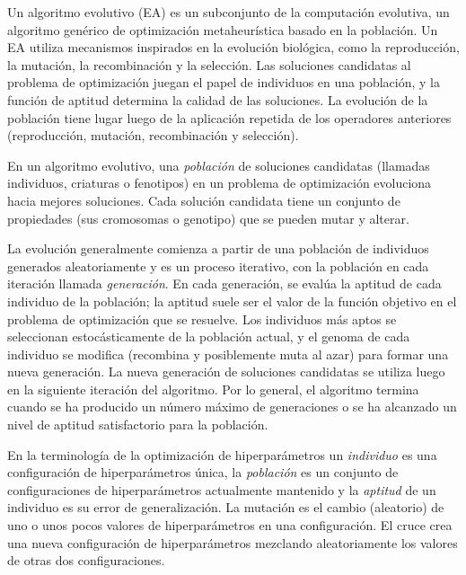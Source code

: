 Un algoritmo evolutivo (EA) es un subconjunto de la computación evolutiva, un algoritmo genérico de optimización metaheurística basado en la población. Un EA utiliza mecanismos inspirados en la evolución biológica, como la reproducción, la mutación, la recombinación y la selección. Las soluciones candidatas al problema de optimización juegan el papel de individuos en una población, y la función de aptitud determina la calidad de las soluciones. La evolución de la población tiene lugar luego de la aplicación repetida de los operadores anteriores (reproducción, mutación, recombinación y selección).

En un algoritmo evolutivo, una \textit{población} de soluciones candidatas (llamadas individuos, criaturas o fenotipos) en un problema de optimización evoluciona hacia mejores soluciones. Cada solución candidata tiene un conjunto de propiedades (sus cromosomas o genotipo) que se pueden mutar y alterar.

La evolución generalmente comienza a partir de una población de individuos generados aleatoriamente y es un proceso iterativo, con la población en cada iteración llamada \textit{generación}. En cada generación, se evalúa la aptitud de cada individuo de la población; la aptitud suele ser el valor de la función objetivo en el problema de optimización que se resuelve. Los individuos más aptos se seleccionan estocásticamente de la población actual, y el genoma de cada individuo se modifica (recombina y posiblemente muta al azar) para formar una nueva generación. La nueva generación de soluciones candidatas se utiliza luego en la siguiente iteración del algoritmo. Por lo general, el algoritmo termina cuando se ha producido un número máximo de generaciones o se ha alcanzado un nivel de aptitud satisfactorio para la población.

En la terminología de la optimización de hiperparámetros un \textit{individuo} es una configuración de hiperparámetros única, la \textit{población} es un conjunto de configuraciones de hiperparámetros actualmente mantenido y la \textit{aptitud} de un individuo es su error de generalización. La mutación es el cambio (aleatorio) de uno o unos pocos valores de hiperparámetros en una configuración. El cruce crea una nueva configuración de hiperparámetros mezclando aleatoriamente los valores de otras dos configuraciones.


